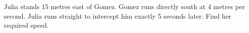 Julia stands 15 metres east of Gomez. Gomez runs directly south at 4 metres per second. Julia runs straight to intercept him exactly 5 seconds later. Find her required speed.
